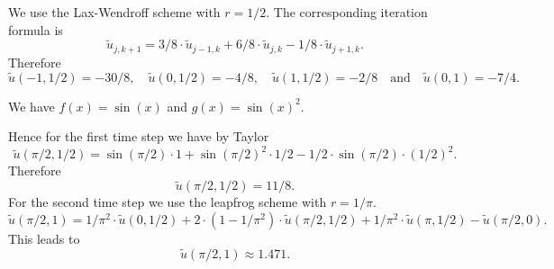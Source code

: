 \begin{loesung}
\begin{teilaufgaben}
\item
We use the Lax-Wendroff scheme with $r = 1/2$.
The corresponding iteration formula is
\begin{equation}
\tilde u_{j,k+1}
=
3/8 \cdot \tilde u_{j-1,k} + 6/8 \cdot \tilde u_{j,k}
- 1/8 \cdot \tilde u_{j+1,k}.
\tag{1P}
\end{equation}
Therefore
\begin{equation}
\tilde u(-1,1/2)
=
-30/8,
\quad
\tilde u(0,1/2) = -4/8,
\quad
\tilde u(1,1/2) = -2/8
\quad\text{and}\quad
\tilde u(0,1) = -7/4.
\tag{1P}
\end{equation}

\vspace{5mm}

\item
We have $f(x) = \sin(x)$ and $g(x) = \sin(x)^2$. 

\smallskip

Hence for the first time step we have by Taylor
\begin{equation}
\tilde u(\pi/2, 1/2)
=
\sin(\pi/2) \cdot 1 + \sin(\pi/2)^2 \cdot 1/2
- 1/2 \cdot \sin(\pi/2) \cdot (1/2)^2.
\tag{1P}
\end{equation}
Therefore
\begin{equation}
\tilde u(\pi/2, 1/2) = 11/8.
\tag{1P}
\end{equation}
For the second time step we use the leapfrog scheme with $r = 1/\pi$.
\begin{equation}
\tilde u(\pi/2, 1)
=
1/\pi^2 \cdot \tilde u(0, 1/2)
+ 2 \cdot (1 - 1/\pi^2) \cdot \tilde u(\pi/2,1/2)
+ 1/\pi^2 \cdot \tilde u(\pi, 1/2) - \tilde u(\pi/2,0).
\tag{1P}
\end{equation}
This leads to
\begin{equation}
\tilde u(\pi/2, 1) \approx 1.471. \tag{1P}
\end{equation}
\end{teilaufgaben}
\end{loesung}

